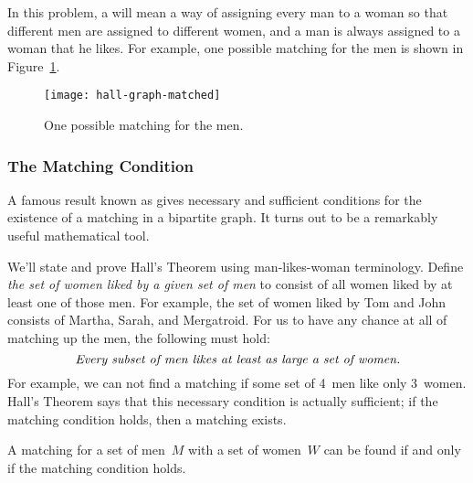 In this problem, a  will mean a way of assigning every
man to a woman so that different men are assigned to different women,
and a man is always assigned to a woman that he likes.  For example,
one possible matching for the men is shown in Figure~\ref{fig:5K}.

\begin{figure}

\texttt{[image: hall-graph-matched]}


\caption{One possible matching for the men.}

\label{fig:5K}

\end{figure}

\subsubsection{The Matching Condition}

A famous result known as  gives necessary
and sufficient conditions for the existence of a matching in a
bipartite graph.  It turns out to be a remarkably useful mathematical
tool.

We'll state and prove Hall's Theorem using man-likes-woman
terminology.  Define \emph{the set of women liked by a given set of
  men} to consist of all women liked by at least one of those men.
For example, the set of women liked by Tom and John consists of
Martha, Sarah, and Mergatroid.  For us to have any chance at all of
matching up the men, the following  must
hold:
\begin{equation*}
\text{\emph{Every subset of men likes at least as large a set of women.}}
\end{equation*}
For example, we can not find a matching if some set of 4~men like only
3~women.  Hall's Theorem says that this necessary condition is
actually sufficient; if the matching condition holds, then a matching
exists.

\begin{theorem}\label{thm:matching}
A matching for a set of men~$M$ with a set of women~$W$ can be found
if and only if the matching condition holds.
\end{theorem}


